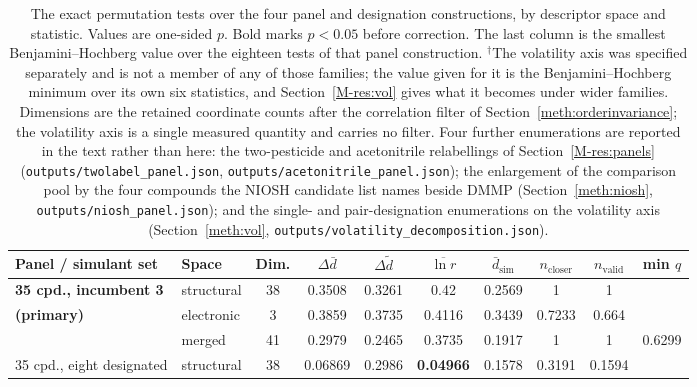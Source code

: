\begin{table}[htb]
\centering
\caption{The exact permutation tests over the four panel and designation
constructions, by descriptor space and statistic. Values are one-sided $p$.
Bold marks $p<0.05$ before correction. The last column is the smallest
Benjamini--Hochberg value over the eighteen tests of that panel construction.
$^{\dagger}$The volatility axis was specified separately and is not a member of
any of those families; the value given for it is the Benjamini--Hochberg
minimum over its own six statistics, and
Section~\ref{M-res:vol} gives what it becomes under wider families.
Dimensions are the retained coordinate counts after the correlation filter of
Section~\ref{meth:orderinvariance}; the volatility axis is a single measured
quantity and carries no filter. Four further enumerations are reported in the
text rather than here: the two-pesticide and acetonitrile relabellings of
Section~\ref{M-res:panels}
(\texttt{outputs/twolabel\_panel.json}, \texttt{outputs/acetonitrile\_panel.json});
the enlargement of the comparison pool by the four compounds the NIOSH
candidate list names beside DMMP (Section~\ref{meth:niosh},
\texttt{outputs/niosh\_panel.json}); and the single- and pair-designation
enumerations on the volatility axis (Section~\ref{meth:vol},
\texttt{outputs/volatility\_decomposition.json}).}
\label{tab:ablation}
\footnotesize
\setlength{\tabcolsep}{3pt}
\begin{tabular}{llcccccccc}
\hline
Panel / simulant set & Space & Dim. & $\Delta\bar{d}$ & $\Delta\tilde{d}$ &
$\overline{\ln r}$ & $\bar{d}_\mathrm{sim}$ & $n_\mathrm{closer}$ &
$n_\mathrm{valid}$ & min $q$ \\
\hline
\textbf{35 cpd., incumbent 3} & structural  & 38 & 0.3508 & 0.3261 & 0.42 & 0.2569 & 1 & 1 &  \\
\textbf{(primary)}     & electronic  &  3 & 0.3859 & 0.3735 & 0.4116 & 0.3439 & 0.7233 & 0.664 &  \\
                       & merged      & 41 & 0.2979 & 0.2465 & 0.3735 & 0.1917 & 1 & 1 & 0.6299 \\
\hline
35 cpd., eight designated & structural  & 38 & 0.06869 & 0.2986 & \textbf{0.04966} & 0.1578 & 0.3191 & 0.1594 &  \\

\end{tabular}
\end{table}
